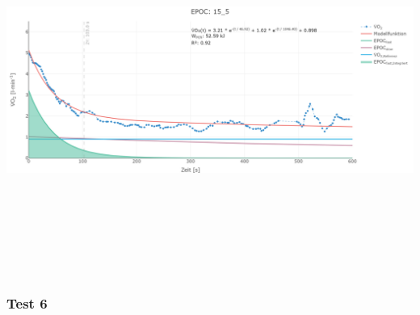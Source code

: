 \documentclass[
  letterpaper,
  DIV=11]{scrartcl}
\begin{document}
\includegraphics[width=11.45833in,height=4.6875in]{images/15_5.png}

\subsubsection{Test 6}
\end{document}
